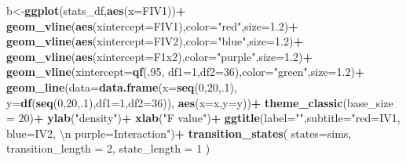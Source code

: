 \documentclass[
]{book}
\newenvironment{Shaded}{\begin{snugshade}}{\end{snugshade}}
\newcommand{\CharTok}[1]{\textcolor[rgb]{0.31,0.60,0.02}{#1}}
\newcommand{\DataTypeTok}[1]{\textcolor[rgb]{0.13,0.29,0.53}{#1}}
\newcommand{\DecValTok}[1]{\textcolor[rgb]{0.00,0.00,0.81}{#1}}
\newcommand{\FloatTok}[1]{\textcolor[rgb]{0.00,0.00,0.81}{#1}}
\newcommand{\KeywordTok}[1]{\textcolor[rgb]{0.13,0.29,0.53}{\textbf{#1}}}
\newcommand{\NormalTok}[1]{#1}
\newcommand{\OperatorTok}[1]{\textcolor[rgb]{0.81,0.36,0.00}{\textbf{#1}}}
\newcommand{\StringTok}[1]{\textcolor[rgb]{0.31,0.60,0.02}{#1}}
\begin{document}
\begin{Shaded}
\begin{Highlighting}[]
{{{{\NormalTok{b<-}\KeywordTok{ggplot}\NormalTok{(stats_df,}\KeywordTok{aes}\NormalTok{(}\DataTypeTok{x=}\NormalTok{FIV1))}\OperatorTok{+}
\StringTok{  }\KeywordTok{geom_vline}\NormalTok{(}\KeywordTok{aes}\NormalTok{(}\DataTypeTok{xintercept=}\NormalTok{FIV1),}\DataTypeTok{color=}\StringTok{"red"}\NormalTok{,}\DataTypeTok{size=}\FloatTok{1.2}\NormalTok{)}\OperatorTok{+}
\StringTok{  }\KeywordTok{geom_vline}\NormalTok{(}\KeywordTok{aes}\NormalTok{(}\DataTypeTok{xintercept=}\NormalTok{FIV2),}\DataTypeTok{color=}\StringTok{"blue"}\NormalTok{,}\DataTypeTok{size=}\FloatTok{1.2}\NormalTok{)}\OperatorTok{+}
\StringTok{  }\KeywordTok{geom_vline}\NormalTok{(}\KeywordTok{aes}\NormalTok{(}\DataTypeTok{xintercept=}\NormalTok{F1x2),}\DataTypeTok{color=}\StringTok{"purple"}\NormalTok{,}\DataTypeTok{size=}\FloatTok{1.2}\NormalTok{)}\OperatorTok{+}
\StringTok{  }\KeywordTok{geom_vline}\NormalTok{(}\DataTypeTok{xintercept=}\KeywordTok{qf}\NormalTok{(.}\DecValTok{95}\NormalTok{, }\DataTypeTok{df1=}\DecValTok{1}\NormalTok{,}\DataTypeTok{df2=}\DecValTok{36}\NormalTok{),}\DataTypeTok{color=}\StringTok{"green"}\NormalTok{,}\DataTypeTok{size=}\FloatTok{1.2}\NormalTok{)}\OperatorTok{+}
\StringTok{  }\KeywordTok{geom_line}\NormalTok{(}\DataTypeTok{data=}\KeywordTok{data.frame}\NormalTok{(}\DataTypeTok{x=}\KeywordTok{seq}\NormalTok{(}\DecValTok{0}\NormalTok{,}\DecValTok{20}\NormalTok{,.}\DecValTok{1}\NormalTok{),}
                            \DataTypeTok{y=}\KeywordTok{df}\NormalTok{(}\KeywordTok{seq}\NormalTok{(}\DecValTok{0}\NormalTok{,}\DecValTok{20}\NormalTok{,.}\DecValTok{1}\NormalTok{),}\DataTypeTok{df1=}\DecValTok{1}\NormalTok{,}\DataTypeTok{df2=}\DecValTok{36}\NormalTok{)),}
            \KeywordTok{aes}\NormalTok{(}\DataTypeTok{x=}\NormalTok{x,}\DataTypeTok{y=}\NormalTok{y))}\OperatorTok{+}
\StringTok{  }\KeywordTok{theme_classic}\NormalTok{(}\DataTypeTok{base_size =} \DecValTok{20}\NormalTok{)}\OperatorTok{+}
\StringTok{  }\KeywordTok{ylab}\NormalTok{(}\StringTok{"density"}\NormalTok{)}\OperatorTok{+}
\StringTok{  }\KeywordTok{xlab}\NormalTok{(}\StringTok{"F value"}\NormalTok{)}\OperatorTok{+}
\StringTok{  }\KeywordTok{ggtitle}\NormalTok{(}\DataTypeTok{label=}\StringTok{""}\NormalTok{,}\DataTypeTok{subtitle=}\StringTok{"red=IV1, blue=IV2, }\CharTok{\textbackslash{}n}\StringTok{ purple=Interaction"}\NormalTok{)}\OperatorTok{+}
\StringTok{  }\KeywordTok{transition_states}\NormalTok{(}
    \DataTypeTok{states=}\NormalTok{sims,}
    \DataTypeTok{transition_length =} \DecValTok{2}\NormalTok{,}
    \DataTypeTok{state_length =} \DecValTok{1}
\NormalTok{  )}

}}}}
\end{Highlighting}
\end{Shaded}
\end{document}
